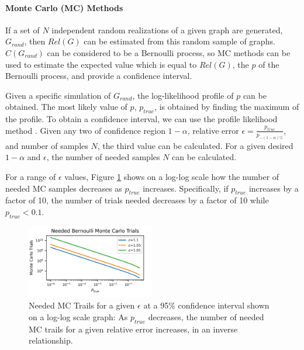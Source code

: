 \documentclass[12pt,twocolumn]{article}
\begin{document}
\hypertarget{monte-carlo-mc-methods}{%
\paragraph{\texorpdfstring{Monte Carlo (MC) Methods\\
}{Monte Carlo (MC) Methods }}\label{monte-carlo-mc-methods}}

If a set of \(N\) independent random realizations of a given graph are generated, \(G_{rand}\), then \(Rel(G)\) can be estimated from this random sample of graphs. \(C(G_{rand})\) can be considered to be a Bernoulli process, so MC methods can be used to estimate the expected value which is equal to \(Rel(G)\), the \(p\) of the Bernoulli process, and provide a confidence interval.

Given a specific simulation of \(G_{rand}\), the log-likelihood profile of \(p\) can be obtained. The most likely value of \(p\), \(p_{true}\), is obtained by finding the maximum of the profile. To obtain a confidence interval, we can use the profile likelihood method \cite{venzon1988method}. Given any two of confidence region \(1-\alpha\), relative error \(\epsilon=\frac{p_{true}}{p_{-(1-\alpha)\%}}\), and number of samples \(N\), the third value can be calculated. For a given desired \(1-\alpha\) and \(\epsilon\), the number of needed samples \(N\) can be calculated.

For a range of \(\epsilon\) values, Figure \ref{fig:MC Trial Graph} shows on a log-log scale how the number of needed MC samples decreases as \(p_{true}\) increases. Specifically, if \(p_{true}\) increases by a factor of 10, the number of trials needed decreases by a factor of 10 while \(p_{true}<0.1\).

\begin{figure}[t]
\caption{Needed MC Trails for a given $\epsilon$ at a 95\% confidence interval shown on a log-log scale graph: As $p_{true}$ decreases, the number of needed MC trails for a given relative error increases, in an inverse relationship.}
\label{fig:MC Trial Graph}
\includegraphics[width=0.5\textwidth]{../figures/MCTrials.png}
\end{figure}
\end{document}
